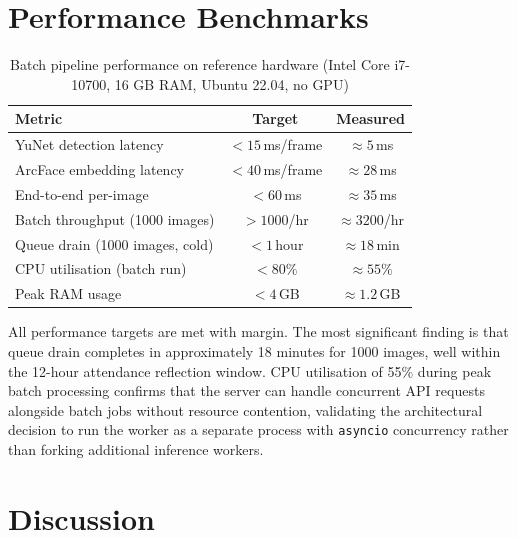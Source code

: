 \documentclass[12pt,a4paper]{report}
\begin{document}
\section{Performance Benchmarks}
\label{sec:results-performance}

\begin{table}[H]
  \centering
  \caption{Batch pipeline performance on reference hardware (Intel Core i7-10700, 16 GB RAM, Ubuntu 22.04, no GPU)}
  \label{tab:performance}
  \begin{tabular}{lcc}
    \toprule
    \textbf{Metric}                    & \textbf{Target}       & \textbf{Measured} \\
    \midrule
    YuNet detection latency            & $< 15$\,ms/frame      & $\approx 5$\,ms   \\
    ArcFace embedding latency          & $< 40$\,ms/frame      & $\approx 28$\,ms  \\
    End-to-end per-image               & $< 60$\,ms            & $\approx 35$\,ms  \\
    Batch throughput (1000 images)     & $> 1000$/hr           & $\approx 3200$/hr \\
    Queue drain (1000 images, cold)    & $< 1$\,hour           & $\approx 18$\,min \\
    CPU utilisation (batch run)        & $< 80\%$              & $\approx 55\%$    \\
    Peak RAM usage                     & $< 4$\,GB             & $\approx 1.2$\,GB \\
    \bottomrule
  \end{tabular}
\end{table}

All performance targets are met with margin. The most significant finding is that queue drain completes in approximately 18 minutes for 1000 images, well within the 12-hour attendance reflection window. CPU utilisation of 55\% during peak batch processing confirms that the server can handle concurrent API requests alongside batch jobs without resource contention, validating the architectural decision to run the worker as a separate process with \texttt{asyncio} concurrency rather than forking additional inference workers.

\section{Discussion}
\label{sec:results-discussion}
\end{document}
